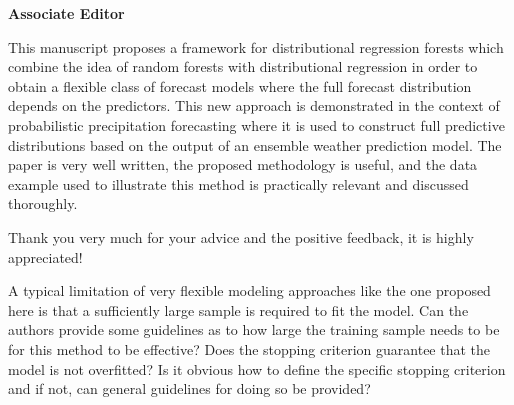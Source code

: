 \documentclass[american,foldmarks=false,noconfig]{uibklttr}
\newenvironment{review}{\fontshape{\itdefault}\fontseries{\bfdefault} \selectfont \smallskip}{\par}
\begin{document}
\textbf{\LARGE Associate Editor}

\begin{review}
This manuscript proposes a framework for distributional regression 
forests which combine the idea of random forests with distributional 
regression in order to obtain a flexible class of forecast models 
where the full forecast distribution depends on the predictors. 
This new approach is demonstrated in the context of probabilistic 
precipitation forecasting where it is used to construct full 
predictive distributions based on the output of an ensemble 
weather prediction model. The paper is very well written, the 
proposed methodology is useful, and the data example used to 
illustrate this method is practically relevant and discussed 
thoroughly.
\end{review}

Thank you very much for your advice and the positive feedback, 
it is highly appreciated!


\begin{review}
A typical limitation of very flexible modeling approaches like 
the one proposed here is that a sufficiently large sample is 
required to fit the model. Can the authors provide some 
guidelines as to how large the training sample needs to be for 
this method to be effective? Does the stopping criterion 
guarantee that the model is not overfitted? 
Is it obvious how to define the specific stopping criterion and 
if not, can general guidelines for doing so be provided?
\end{review}
\end{document}
